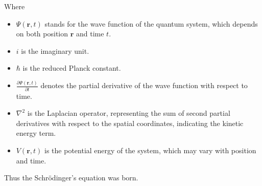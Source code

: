 Where
\begin{itemize}
\item $\Psi(\mathbf{r}, t)$ stands for the wave function of the quantum system, which depends on both position $\mathbf{r}$ and time $t$.
\item $i$ is the imaginary unit.
\item $\hbar$ is the reduced Planck constant.
\item $\frac{\partial \Psi(\mathbf{r}, t)}{\partial t}$ denotes the partial derivative of the wave function with respect to time.
\item $\nabla^2$ is the Laplacian operator, representing the sum of second partial derivatives with respect to the spatial coordinates, indicating the kinetic energy term.
\item $V(\mathbf{r}, t)$ is the potential energy of the system, which may vary with position and time.
\end{itemize}

Thus the  Schrödinger's equation was born\cite{Schrödinger_1926}.